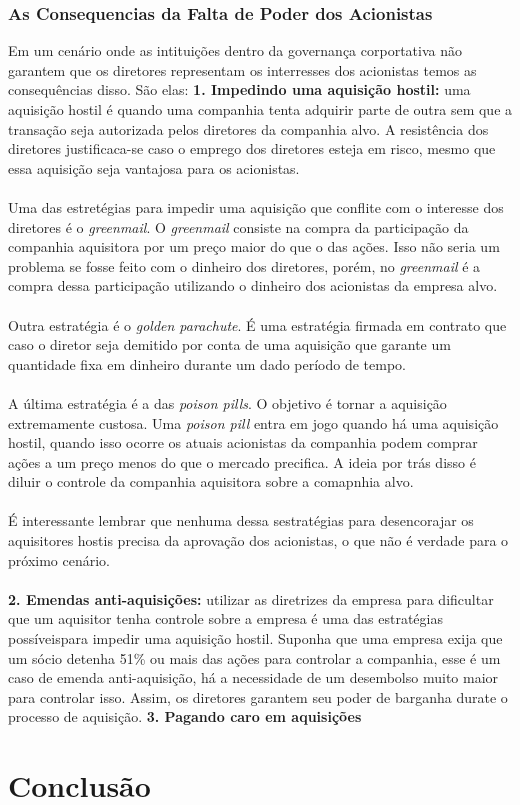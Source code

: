 \subsubsection*{As Consequencias da Falta de Poder dos Acionistas}
Em um cenário onde as intituições dentro da governança corportativa não garantem que os diretores representam os interresses dos acionistas temos as consequências disso. São elas:
\textbf{1. Impedindo uma aquisição hostil:} uma aquisição hostil é quando uma companhia tenta adquirir parte de outra sem que a transação seja autorizada pelos diretores da companhia alvo. A resistência dos diretores justificaca-se caso o emprego dos diretores esteja em risco, mesmo que essa aquisição seja vantajosa para os acionistas.
\\~\\
Uma das estretégias para impedir uma aquisição que conflite com o interesse dos diretores é o \textit{greenmail}. O \textit{greenmail} consiste na compra da participação da companhia aquisitora por um preço maior do que o das ações. Isso não seria um problema se fosse feito com o dinheiro dos diretores, porém, no \textit{greenmail} é a compra dessa participação utilizando o dinheiro dos acionistas da empresa alvo.
\\~\\
Outra estratégia é o \textit{golden parachute}. É uma estratégia firmada em contrato que caso o diretor seja demitido por conta de uma aquisição que garante um quantidade fixa em dinheiro durante um dado período de tempo.
\\~\\
A última estratégia é a das \textit{poison pills}. O objetivo é tornar a aquisição extremamente custosa. Uma \textit{poison pill} entra em jogo quando há uma aquisição hostil, quando isso ocorre os atuais acionistas da companhia podem comprar ações a um preço menos do que o mercado precifica. A ideia por trás disso é diluir o controle da companhia aquisitora sobre a comapnhia alvo.
\\~\\
É interessante lembrar que nenhuma dessa sestratégias para desencorajar os aquisitores hostis precisa da aprovação dos acionistas, o que não é verdade para o próximo cenário.
\\~\\
\textbf{2. Emendas anti-aquisições:} utilizar as diretrizes da empresa para dificultar que um aquisitor tenha controle sobre a empresa é  uma das estratégias possíveispara impedir uma aquisição hostil. Suponha que uma empresa exija que um sócio detenha 51\% ou mais das ações para controlar a companhia, esse é um caso de emenda anti-aquisição, há a necessidade de um desembolso muito maior para controlar isso. Assim, os diretores garantem seu poder de barganha durate o processo de aquisição.
\textbf{3. Pagando caro em aquisições}
\section{Conclusão}
